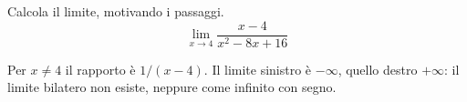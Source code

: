 
\begin{esercizio}
Calcola il limite, motivando i passaggi.
\[
        \lim_{x\to 4}
        \frac{x-4}{x^2-8x+16}
    \]
\end{esercizio}

\begin{soluzione}
Per $x\ne4$ il rapporto è $1/(x-4)$. Il limite sinistro è $-\infty$, quello destro $+\infty$: il limite bilatero non esiste, neppure come infinito con segno.
\end{soluzione}

